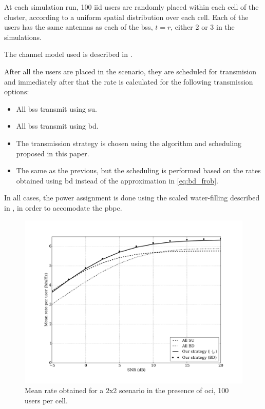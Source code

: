 At each simulation run, 100 \gls{iid} users are randomly placed within each cell
of the cluster, according to a uniform spatial distribution over each cell. Each
of the users has the same antennas as each of the \glspl{bs}, \ie $t=r$, either
2 or 3 in the simulations.

The channel model used is described in .

After all the users are placed in the scenario, they are scheduled for
transmision and immediately after that the rate is calculated for the following
transmission options:

\begin{itemize}
    \item All \glspl{bs} transmit using \gls{su}.
    \item All \glspl{bs} transmit using \gls{bd}.
    \item The transmission strategy is chosen using the algorithm and scheduling
        proposed in this paper.
    \item The same as the previous, but the scheduling is performed based on the
        rates obtained using \gls{bd} instead of the approximation in
        \eqref{eq:bd_frob}.
\end{itemize}

In all cases, the power assignment is done using the scaled water-filling
described in , in order to accomodate the \gls{pbpc}.

\begin{figure}[t]
\centering
\includegraphics[width=0.75\columnwidth]{./12.simple_threshold_scheduling/img/mean_rate_02x02_100user_bd}
\caption{Mean rate obtained for a 2x2 scenario in the presence of \gls{oci}, 100
users per cell.}
\label{fig:mean_rate_2x2}
\end{figure}

